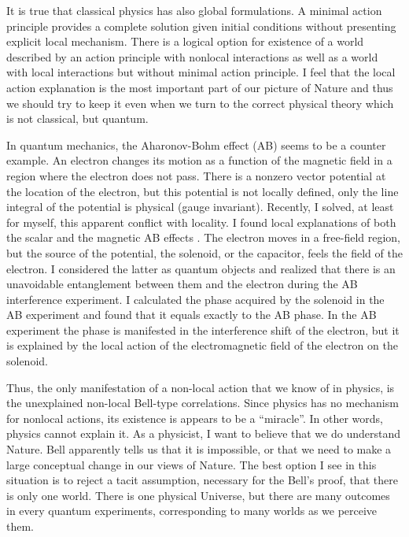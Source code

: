 \documentclass[12pt]{article}
\begin{document}
It is true that classical physics has also global formulations. A minimal action principle provides a complete solution given initial conditions without presenting explicit local mechanism.  There is a logical option for existence of a world  described by an action principle with nonlocal interactions as well as a world with local interactions but without minimal action principle. I feel that the local action explanation is the most important part of our picture of Nature and thus  we should try to keep it even when we turn to the correct physical theory which is not classical, but quantum.

In quantum mechanics,  the Aharonov-Bohm effect \cite{AB} (AB) seems to be a counter example. An electron changes its motion as a function of the magnetic field in a region where the electron does not pass. There is a nonzero vector potential at the location of the electron, but this potential  is not locally defined, only the line integral of the potential is physical (gauge invariant). Recently, I solved, at least for myself, this apparent conflict with locality. I found local explanations of both the scalar and the magnetic  AB effects \cite{VAB}. The electron moves in a free-field region, but the source of the potential, the solenoid, or the capacitor, feels the field of the electron. I considered the latter as  quantum objects and realized that there is an unavoidable entanglement between them and the electron during the AB interference experiment. I calculated the phase acquired by the solenoid in the AB experiment and found that it equals exactly to the AB phase. In the AB experiment the phase is manifested in the interference shift of the electron, but it is explained by the local action of the electromagnetic field of the electron on the solenoid.


Thus, the only manifestation of a non-local action  that we know of in physics, is the unexplained non-local Bell-type correlations. Since physics has no mechanism for nonlocal actions, its existence is appears to be a ``miracle''. In other words, physics cannot explain it. As a physicist, I want to believe that we do understand Nature. Bell apparently tells us that it is impossible, or that we need to make a large conceptual change in our views of Nature. The best option I see in this situation is to reject a tacit assumption, necessary for the Bell's proof, that there is only one world. There is one physical Universe, but there are many outcomes in every quantum experiments, corresponding to many worlds as we perceive them.
\end{document}
